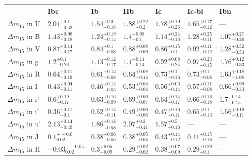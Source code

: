 \begin{tabular}{lllllll}
\toprule
{} &                       Ibc &                      Ib &                     IIb &                      Ic &                   Ic-bl &                     Ibn \\
\midrule
${\Delta m}_{15}$ in U   &     $2.01_{-0.52}^{+0.1}$ &   $1.54_{-0.16}^{+0.3}$ &   $1.88_{-0.2}^{+0.22}$ &  $1.78_{-0.26}^{+0.19}$ &  $1.65_{-0.12}^{+0.17}$ &                     --- \\
${\Delta m}_{15}$ in B   &    $1.43_{-0.18}^{+0.08}$ &  $1.24_{-0.14}^{+0.19}$ &    $1.4_{-0.1}^{+0.08}$ &  $1.14_{-0.16}^{+0.24}$ &  $1.28_{-0.11}^{+0.25}$ &  $1.07_{-0.26}^{+0.27}$ \\
${\Delta m}_{15}$ in V   &    $0.87_{-0.17}^{+0.14}$ &   $0.84_{-0.08}^{+0.1}$ &  $0.88_{-0.09}^{+0.08}$ &   $0.86_{-0.1}^{+0.15}$ &  $0.92_{-0.12}^{+0.11}$ &  $1.28_{-0.54}^{+0.52}$ \\
${\Delta m}_{15}$ in g   &      $1.2_{-0.26}^{+0.1}$ &  $1.13_{-0.17}^{+0.12}$ &   $1.1_{-0.14}^{+0.11}$ &  $0.92_{-0.24}^{+0.08}$ &  $0.97_{-0.15}^{+0.23}$ &  $1.76_{-0.33}^{+0.12}$ \\
${\Delta m}_{15}$ in R   &    $0.64_{-0.19}^{+0.11}$ &  $0.61_{-0.08}^{+0.13}$ &  $0.64_{-0.14}^{+0.08}$ &   $0.73_{-0.16}^{+0.1}$ &   $0.73_{-0.06}^{+0.1}$ &  $1.63_{-1.08}^{+0.18}$ \\
${\Delta m}_{15}$ in I   &    $0.43_{-0.11}^{+0.04}$ &  $0.46_{-0.05}^{+0.15}$ &  $0.53_{-0.04}^{+0.04}$ &  $0.56_{-0.14}^{+0.06}$ &  $0.57_{-0.08}^{+0.11}$ &  $0.66_{-0.33}^{+0.99}$ \\
${\Delta m}_{15}$ in r'  &     $0.6_{-0.17}^{+0.19}$ &  $0.63_{-0.09}^{+0.16}$ &  $0.69_{-0.07}^{+0.06}$ &  $0.64_{-0.17}^{+0.14}$ &  $0.66_{-0.18}^{+0.16}$ &   $1.7_{-0.15}^{+0.14}$ \\
${\Delta m}_{15}$ in i'  &     $0.36_{-0.1}^{+0.11}$ &  $0.52_{-0.11}^{+0.14}$ &  $0.49_{-0.06}^{+0.06}$ &  $0.47_{-0.11}^{+0.16}$ &   $0.65_{-0.13}^{+0.1}$ &  $1.56_{-0.11}^{+0.19}$ \\
${\Delta m}_{15}$ in u'  &    $2.13_{-0.49}^{+0.14}$ &  $1.86_{-0.58}^{+0.18}$ &   $2.07_{-0.41}^{+0.2}$ &   $1.57_{-0.16}^{+0.5}$ &                     --- &                     --- \\
${\Delta m}_{15}$ in J   &      $0.1_{0.02}^{+-0.0}$ &  $0.38_{-0.06}^{+0.06}$ &  $0.38_{-0.04}^{+0.05}$ &  $0.43_{-0.12}^{+0.14}$ &  $0.41_{-0.16}^{+0.15}$ &                     --- \\
${\Delta m}_{15}$ in H   &   $-0.03_{0.02}^{+-0.05}$ &   $0.3_{-0.09}^{+0.05}$ &  $0.29_{-0.02}^{+0.02}$ &  $0.38_{-0.09}^{+0.07}$ &   $0.29_{-0.1}^{+0.29}$ &                     --- \\

\end{tabular}
